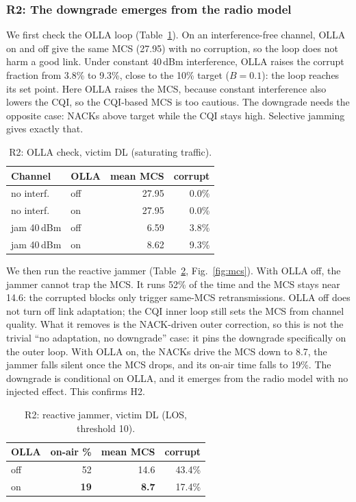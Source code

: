 \documentclass[conference]{IEEEtran}
\begin{document}
\subsubsection*{R2: The downgrade emerges from the radio model}
We first check the OLLA loop (Table~\ref{tab:r2a}). On an interference-free channel, OLLA
on and off give the same MCS (27.95) with no corruption, so the loop does not harm a good
link. Under constant 40\,dBm interference, OLLA raises the corrupt fraction from 3.8\%
to 9.3\%, close to the 10\% target ($B=0.1$): the loop reaches its set point. Here OLLA raises
the MCS, because constant interference also lowers the CQI, so the CQI-based MCS is too
cautious. The downgrade needs the opposite case: NACKs above target while the CQI
stays high. Selective jamming gives exactly that.

\begin{table}[t]\centering
\caption{R2: OLLA check, victim DL (saturating traffic).}
\label{tab:r2a}
\begin{tabular}{llrr}\toprule
Channel & OLLA & mean MCS & corrupt \\\midrule
no interf. & off & 27.95 & 0.0\% \\
no interf. & on  & 27.95 & 0.0\% \\
jam 40\,dBm & off & 6.59 & 3.8\% \\
jam 40\,dBm & on  & 8.62 & 9.3\% \\\bottomrule
\end{tabular}\end{table}

We then run the reactive jammer (Table~\ref{tab:r2b}, Fig.~\ref{fig:mcs}). With OLLA
off, the jammer cannot trap the MCS. It runs 52\% of the time and the MCS stays near
14.6: the corrupted blocks only trigger same-MCS retransmissions. OLLA off does not turn
off link adaptation; the CQI inner loop still sets the MCS from channel quality. What it
removes is the NACK-driven outer correction, so this is not the trivial ``no adaptation,
no downgrade'' case: it pins the downgrade specifically on the outer loop. With OLLA on,
the NACKs drive the MCS down to 8.7, the jammer falls silent once the MCS drops, and its
on-air time falls to 19\%. The downgrade is conditional on OLLA, and it emerges from
the radio model with no injected effect. This confirms H2.

\begin{table}[t]\centering
\caption{R2: reactive jammer, victim DL (LOS, threshold 10).}
\label{tab:r2b}
\begin{tabular}{lrrr}\toprule
OLLA & on-air \% & mean MCS & corrupt \\\midrule
off & 52 & 14.6 & 43.4\% \\
on  & \textbf{19} & \textbf{8.7} & 17.4\% \\\bottomrule
\end{tabular}\end{table}
\end{document}

